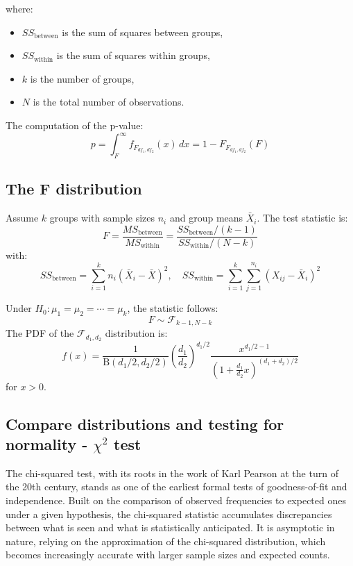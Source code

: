 \documentclass{book}
\begin{document}
where:
\begin{itemize}
  \item $SS_{\text{between}}$ is the sum of squares between groups,
  \item $SS_{\text{within}}$ is the sum of squares within groups,
  \item $k$ is the number of groups,
  \item $N$ is the total number of observations.
\end{itemize}

The computation of the p-value:
\[
p = \int_{F}^{\infty} f_{F_{df_1, df_2}}(x)\,dx = 1 - F_{F_{df_1, df_2}}(F)
\]

\subsection*{The F distribution}

Assume \( k \) groups with sample sizes \( n_i \) and group means \( \bar{X}_i \). The test statistic is:
\[
F = \frac{MS_{\text{between}}}{MS_{\text{within}}} = \frac{SS_{\text{between}} / (k - 1)}{SS_{\text{within}} / (N - k)}
\]
with:
\[
SS_{\text{between}} = \sum_{i=1}^{k} n_i (\bar{X}_i - \bar{X})^2, \quad SS_{\text{within}} = \sum_{i=1}^{k} \sum_{j=1}^{n_i} (X_{ij} - \bar{X}_i)^2
\]

Under \( H_0: \mu_1 = \mu_2 = \cdots = \mu_k \), the statistic follows:
\[
F \sim \mathcal{F}_{k-1, N-k}
\]
The PDF of the \( \mathcal{F}_{d_1, d_2} \) distribution is:
\[
f(x) = \frac{1}{\mathrm{B}(d_1/2, d_2/2)} \left(\frac{d_1}{d_2}\right)^{d_1/2} \frac{x^{d_1/2 - 1}}{\left(1 + \frac{d_1}{d_2}x\right)^{(d_1 + d_2)/2}}
\]
for \( x > 0 \).

\cite{fisher1925}

\newpage

\subsection{Compare distributions and testing for normality - $\chi^{2}$ test}

The chi-squared test, with its roots in the work of Karl Pearson at the turn of the 20th century, stands as one of the earliest formal tests of goodness-of-fit and independence. Built on the comparison of observed frequencies to expected ones under a given hypothesis, the chi-squared statistic accumulates discrepancies between what is seen and what is statistically anticipated. It is asymptotic in nature, relying on the approximation of the chi-squared distribution, which becomes increasingly accurate with larger sample sizes and expected counts.\\
\end{document}
